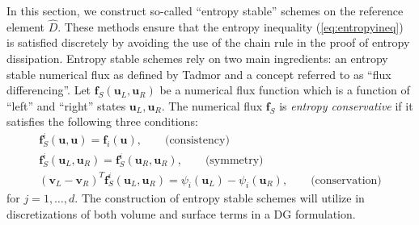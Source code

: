 \documentclass{svjour3}                     %
\renewcommand{\hat}{\widehat}
\newcommand{\LRp}[1]{\left( #1 \right)}
\newcommand{\rnote}[1]{{\color{red}{#1}}}
\begin{document}
In this section, we construct so-called ``entropy stable'' schemes on the reference element $\hat{D}$.  These methods ensure that the entropy inequality (\ref{eq:entropyineq}) is satisfied discretely by avoiding the use of the chain rule in the proof of entropy dissipation.  Entropy stable schemes rely on two main ingredients: an entropy stable numerical flux as defined by Tadmor \cite{tadmor1987numerical} and a concept referred to as ``flux differencing''.  Let $\bm{f}_S\LRp{\bm{u}_L,\bm{u}_R}$ be a numerical flux function which is a function of ``left'' and ``right'' states $\bm{u}_L,\bm{u}_R$.  The numerical flux $\bm{f}_S$ is \textit{entropy conservative} if it satisfies the following three conditions:  
\begin{gather}
\bm{f}^i_S(\bm{u},\bm{u}) = \bm{f}_i(\bm{u}), \qquad \text{(consistency)}\label{eq:esflux}\\
\bm{f}^i_S(\bm{u}_L,\bm{u}_R) = \bm{f}^i_S(\bm{u}_R,\bm{u}_R), \qquad \text{(symmetry)}\nonumber\\
\LRp{\bm{v}_L-\bm{v}_R}^T\bm{f}^i_S(\bm{u}_L,\bm{u}_R) = \psi_i(\bm{u}_L) - \psi_i(\bm{u}_R), \qquad \text{(conservation)}\nonumber
\end{gather}
for $j = 1,\ldots, d$.  The construction of entropy stable schemes will utilize \rnote{(\ref{eq:esflux})} in discretizations of both volume and surface terms in a DG formulation.  
\end{document}
